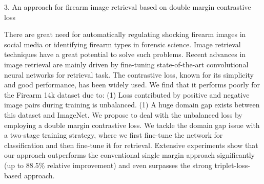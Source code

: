 3. An approach for firearm image retrieval based on double margin contrastive loss

There are great need for automatically regulating shocking firearm images in social media or identifying firearm types in forensic science. Image retrieval techniques have a great potential to solve such problems. Recent advances in image retrieval are mainly driven by fine-tuning state-of-the-art convolutional neural networks for retrieval task. The contrastive loss, known for its simplicity and good performance, has been widely used. We find that it performs poorly for the Firearm 14k dataset due to: (1) Loss contributed by positive and negative image pairs during training is unbalanced. (1) A huge domain gap exists between this dataset and ImageNet. We propose to deal with the unbalanced loss by employing a double margin contrastive loss. We tackle the domain gap issue with a two-stage training strategy, where we first fine-tune the network for classification and then fine-tune it for retrieval. Extensive experiments show that our approach outperforms the conventional single margin approach significantly (up to 88.5\% relative improvement) and even surpasses the strong triplet-loss-based approach.




